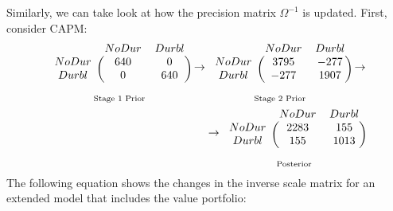 Similarly, we can take look at how the precision matrix $\Omega^{-1}$ is updated. First, consider CAPM:
\begin{eqnarray*}
\underset{\text{Stage 1 Prior}}
{\begin{blockarray}{ccc}
	& NoDur & Durbl  \\ 
	\begin{block}{c(cc)}
	NoDur & 640 & 0 \\ 
	Durbl & 0 & 640 \\ 
	\end{block}
\end{blockarray} }
\rightarrow
\underset{\text{Stage 2 Prior}}
{\begin{blockarray}{ccc}
& NoDur & Durbl \\ 
	\begin{block}{c(cc)}
	NoDur & 3795 & -277 \\ 
	Durbl & -277 & 1907 \\ 
	\end{block}
\end{blockarray} }
\rightarrow \\
\rightarrow
\underset{\text{Posterior}}
{\begin{blockarray}{ccc}
	& NoDur & Durbl \\ 
	\begin{block}{c(cc)}
	NoDur & 2283 & 155 \\ 
	Durbl & 155 & 1013 \\ 
	\end{block}
\end{blockarray}}
\end{eqnarray*}
The following equation shows the changes in the inverse scale matrix for an extended model that includes the value portfolio:

